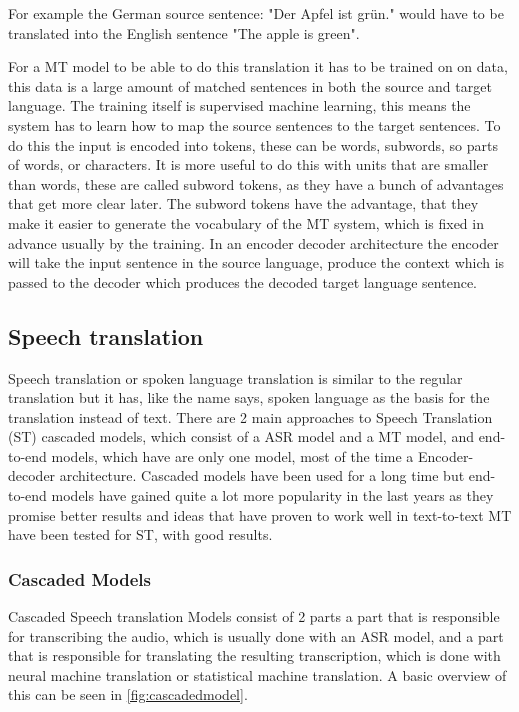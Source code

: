 For example the German source sentence: \color{blue}"Der Apfel ist grün."\color{black} would have to be translated into the English sentence \color{blue}"The apple is green"\color{black}. 

For a MT model to be able to do this translation it has to be trained on on data, this data is a large amount of matched sentences in both the source and target language. The training itself is supervised machine learning, this means the system has to learn how to map the source sentences to the target sentences. To do this the input is encoded into tokens, these can be words, subwords, so parts of words, or characters. It is more useful to do this with units that are smaller than words, these are called subword tokens, as they have a bunch of advantages that get more clear later. The subword tokens have the advantage, that they make it easier to generate the vocabulary of the MT system, which is fixed in advance usually by the training. 
In an encoder decoder architecture the encoder will take the input sentence in the source language, produce the context which is passed to the decoder which produces the decoded target language sentence. \cite[chapter~13.2]{jm3}


\subsection{Speech translation}
Speech translation or spoken language translation is similar to the regular translation but it has, like the name says, spoken language as the basis for the translation instead of text.
There are 2 main approaches to Speech Translation (ST) cascaded models, which consist of a ASR model and a MT model, and end-to-end models, which have are only one model, most of the time a Encoder-decoder architecture.
Cascaded models have been used for a long time but end-to-end models have gained quite a lot more popularity in the last years as they promise better results and ideas that have proven to work well in text-to-text MT have been tested for ST, with good results.

\subsubsection{Cascaded Models}
Cascaded Speech translation Models consist of 2 parts a part that is responsible for transcribing the audio, which is usually done with an ASR model, and a part that is responsible for translating the resulting transcription, which is done with neural machine translation or statistical machine translation. A basic overview of this can be seen in \autoref{fig:cascadedmodel}.

